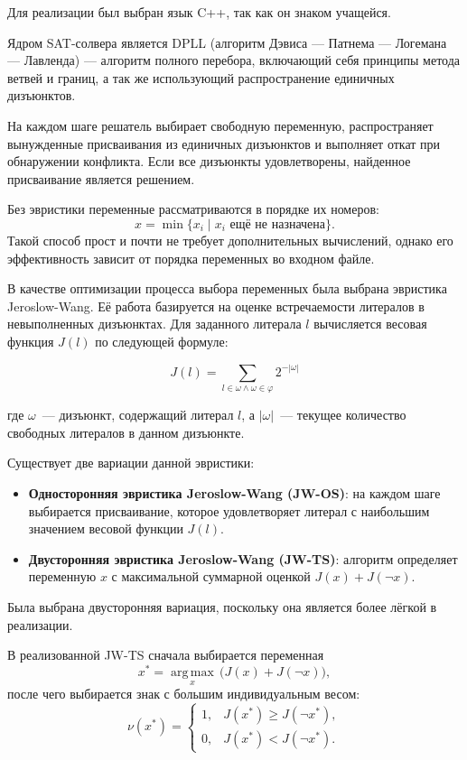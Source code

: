 \documentclass[a4paper]{article}
\begin{document}
Для реализации был выбран язык C++, так как он знаком учащейся.

Ядром SAT-солвера является DPLL (алгоритм Дэвиса — Патнема — Логемана — Лавленда) — алгоритм полного перебора, включающий себя принципы метода ветвей и границ, а так же использующий распространение единичных дизъюнктов.

На каждом шаге решатель выбирает свободную переменную, распространяет
вынужденные присваивания из единичных дизъюнктов и выполняет откат при
обнаружении конфликта. Если все дизъюнкты удовлетворены, найденное присваивание
является решением.

Без эвристики переменные рассматриваются в порядке их номеров:
\begin{equation}
    x = \min \{x_i \mid x_i \text{ ещё не назначена}\}.
\end{equation}
Такой способ прост и почти не требует дополнительных вычислений, однако его
эффективность зависит от порядка переменных во входном файле.

В качестве оптимизации процесса выбора переменных была выбрана эвристика Jeroslow-Wang. Её работа базируется на оценке встречаемости литералов в невыполненных дизъюнктах. Для заданного литерала $l$ вычисляется весовая функция $J(l)$ по следующей формуле:

\begin{equation}
    J(l) = \sum_{l \in \omega \wedge \omega \in \varphi} 2^{-|\omega|}
\end{equation}

где $\omega$~--- дизъюнкт, содержащий литерал $l$, а $|\omega|$~--- текущее количество свободных литералов в данном дизъюнкте.

Существует две вариации данной эвристики:
\begin{itemize}
    \item \textbf{Односторонняя эвристика Jeroslow-Wang (JW-OS)}: на каждом шаге выбирается присваивание, которое удовлетворяет литерал с наибольшим значением весовой функции $J(l)$.
    \item \textbf{Двусторонняя эвристика Jeroslow-Wang (JW-TS)}: алгоритм определяет переменную $x$ с максимальной суммарной оценкой $J(x) + J(\neg x)$.
\end{itemize}
Была выбрана двусторонняя вариация, поскольку она является более лёгкой в реализации.

В реализованной JW-TS сначала выбирается переменная
\begin{equation}
    x^* = \underset{x}{\operatorname{arg\,max}}\,
          \bigl(J(x) + J(\neg x)\bigr),
\end{equation}
после чего выбирается знак с большим индивидуальным весом:
\begin{equation}
    \nu(x^*) =
    \begin{cases}
        1, & J(x^*) \geq J(\neg x^*),\\
        0, & J(x^*) < J(\neg x^*).
    \end{cases}
\end{equation}
\end{document}
